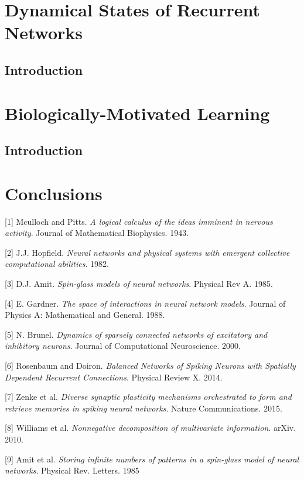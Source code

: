 \documentclass{ucetd}
\begin{document}
\chapter{Dynamical States of Recurrent Networks}
\section{Introduction}


\chapter{Biologically-Motivated Learning}
\section{Introduction}

\chapter{Conclusions}


\makebibliography

[1] Mculloch and Pitts. \textit{A logical calculus of the ideas imminent in nervous activity}. Journal of Mathematical Biophysics. 1943.

[2] J.J. Hopfield. \textit{Neural networks and physical systems with emergent collective computational abilities}. 1982.

[3] D.J. Amit. \textit{Spin-glass models of neural networks}. Physical Rev A. 1985.

[4] E. Gardner. \textit{The space of interactions in neural network models}. Journal of Physics A: Mathematical and General. 1988.

[5] N. Brunel. \textit{Dynamics of sparsely connected networks of excitatory and inhibitory neurons}. Journal of Computational Neuroscience. 2000. 

[6] Rosenbaum and Doiron. \textit{Balanced Networks of Spiking Neurons with Spatially Dependent Recurrent Connections}. Physical Review X. 2014.

[7] Zenke et al. \textit{Diverse synaptic plasticity mechanisms
orchestrated to form and retrieve memories
in spiking neural networks}. Nature Communications. 2015.

[8] Williams et al. \textit{Nonnegative decomposition of multivariate information}. arXiv. 2010.

[9] Amit et al. \textit{Storing infinite numbers of patterns in a spin-glass model of neural networks}. Physical Rev. Letters. 1985
\end{document}
